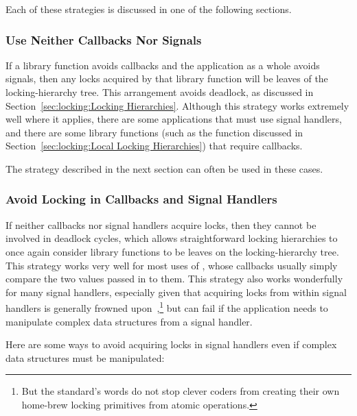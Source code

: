 Each of these strategies is discussed in one of the following sections.

\subsubsection{Use Neither Callbacks Nor Signals}
\label{sec:locking:Use Neither Callbacks Nor Signals}

If a library function avoids callbacks and the application as a whole
avoids signals, then any locks acquired by that library function will
be leaves of the locking-hierarchy tree.
This arrangement avoids deadlock, as discussed in
Section~\ref{sec:locking:Locking Hierarchies}.
Although this strategy works extremely well where it applies,
there are some applications that must use signal handlers,
and there are some library functions (such as the  function
discussed in
Section~\ref{sec:locking:Local Locking Hierarchies})
that require callbacks.

The strategy described in the next section can often be used in these cases.

\subsubsection{Avoid Locking in Callbacks and Signal Handlers}
\label{sec:locking:Avoid Locking in Callbacks and Signal Handlers}

If neither callbacks nor signal handlers acquire locks, then they
cannot be involved in deadlock cycles, which allows straightforward
locking hierarchies to once again consider library functions to
be leaves on the locking-hierarchy tree.
This strategy works very well for most uses of , whose
callbacks usually simply compare the two values passed in to them.
This strategy also works wonderfully for many signal handlers,
especially given that acquiring locks from within signal handlers
is generally frowned upon~\cite{TheOpenGroup1997SUS},\footnote{
	But the standard's words do not stop clever coders from creating
	their own home-brew locking primitives from atomic operations.}
but can fail if the application needs to manipulate complex data structures
from a signal handler.

Here are some ways to avoid acquiring locks in signal handlers even
if complex data structures must be manipulated:

